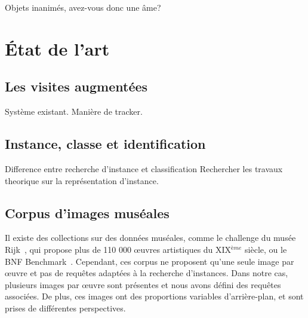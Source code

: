 \begin{savequote}[75mm] 
Objets inanimés, avez-vous donc une âme?
\end{savequote}

\chapter{État de l'art}



\section{Les visites augmentées}

Système existant.
Manière de tracker.


\section{Instance, classe et identification}

Difference entre recherche d'instance et classification
Rechercher les travaux theorique sur la représentation d'instance.


\section{Corpus d'images muséales}

Il existe des collections sur des données muséales, comme le challenge du musée Rijk~\cite{mensink2014rijksmuseum}, qui propose plus de 110 000 œuvres artistiques du XIX$^{\text{\`e}me}$ siècle, ou le BNF Benchmark~\cite{picard2015challenges}. Cependant, ces corpus ne proposent qu'une seule image par œuvre et pas de requêtes adaptées à la recherche d'instances. Dans notre cas, plusieurs images par œuvre sont présentes et nous avons défini des requêtes associées. De plus, ces images ont des proportions variables d'arrière-plan, et sont prises de différentes perspectives.

